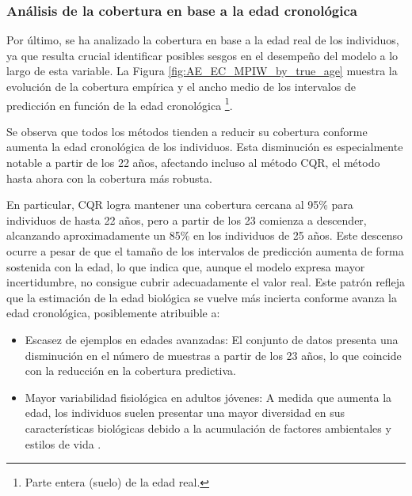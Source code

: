 \subsubsection{Análisis de la cobertura en base a la edad cronológica}

Por último, se ha analizado la cobertura en base a la edad real de los individuos, ya que resulta crucial identificar posibles sesgos en el desempeño del modelo a lo largo de esta variable. 
La Figura \ref{fig:AE_EC_MPIW_by_true_age} muestra la evolución de la cobertura empírica y el ancho medio de los intervalos de predicción en función de la edad cronológica%
\footnote{
    Parte entera (suelo) de la edad real.
}.

Se observa que todos los métodos tienden a reducir su cobertura conforme aumenta la edad cronológica de los individuos. Esta disminución es especialmente notable a partir de los 22 años, afectando incluso al método CQR, el método hasta ahora con la cobertura más robusta.

En particular, CQR logra mantener una cobertura cercana al 95\% para individuos de hasta 22 años, pero a partir de los 23 comienza a descender, alcanzando aproximadamente un 85\% en los individuos de 25 años. Este descenso ocurre a pesar de que el tamaño de los intervalos de predicción aumenta de forma sostenida con la edad, lo que indica que, aunque el modelo expresa mayor incertidumbre, no consigue cubrir adecuadamente el valor real. Este patrón refleja que la estimación de la edad biológica se vuelve más incierta conforme avanza la edad cronológica, posiblemente atribuible a:

\begin{itemize}

    \item Escasez de ejemplos en edades avanzadas: El conjunto de datos presenta una disminución en el número de muestras a partir de los 23 años, lo que coincide con la reducción en la cobertura predictiva. 
    
    \item Mayor variabilidad fisiológica en adultos jóvenes: A medida que aumenta la edad, los individuos suelen presentar una mayor diversidad en sus características biológicas debido a la acumulación de factores ambientales y estilos de vida \cite{ubelaker2018, scheuer2004}.

\end{itemize}


